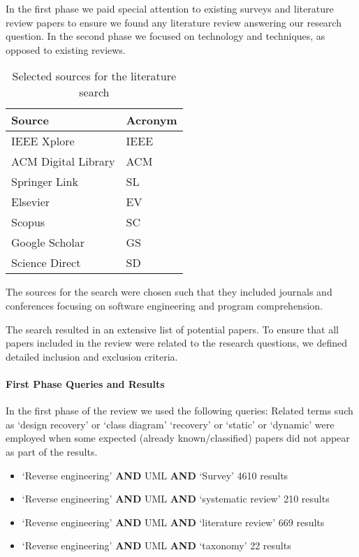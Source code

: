 In the first phase we paid special attention to  existing surveys and literature review papers to ensure we found any literature review answering our research question.
In the second phase we  focused on technology and techniques, as opposed to existing reviews. 

\begin{table}[ht]
\caption{Selected sources for the literature search}
\label{table:sourcesReviewed}
\centering
\begin{tabular}{ll}
\toprule
\rowcolor[HTML]{BBDAFF}
\textbf{Source}   & \textbf{Acronym} \\ 
\hline
IEEE Xplore	& IEEE   \\ 
ACM Digital Library &	ACM   \\ 
Springer Link	&SL   \\ 
Elsevier	&EV   \\ 
Scopus & SC   \\ 
Google Scholar &	GS   \\ 
Science Direct &	SD   \\ 
\hline
\end{tabular}
\end{table}

The sources for the search were chosen such that they included journals and conferences focusing on software engineering and program comprehension. 

The search resulted in an extensive list of potential papers. To ensure that all papers included in the review were related to the research questions, we defined detailed inclusion and exclusion criteria.  

\paragraph*{First Phase Queries and Results}

In the first phase of the review we used the following queries:
Related terms such as `design recovery' or `class diagram' `recovery' or `static' or `dynamic' were employed when some expected (already known/classified) papers did not appear as part of the results.

\begin{itemize}
\item `Reverse engineering' \textbf{AND}  UML \textbf{AND} `Survey'  4610 results
\item `Reverse engineering' \textbf{AND}  UML \textbf{AND} `systematic review' 210 results
\item `Reverse engineering' \textbf{AND}  UML \textbf{AND} `literature review' 669 results
\item `Reverse engineering' \textbf{AND}  UML \textbf{AND} `taxonomy' 22 results
\end{itemize}


